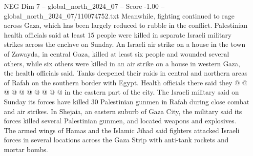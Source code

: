 \begin{textsample}{NEG Dim 7 – global\_north\_2024\_07 – Score -1.00 – global\_north\_2024\_07/110074752.txt}
Meanwhile, fighting continued to rage across Gaza, which has been largely reduced to rubble in the conflict.
Palestinian health officials said at least 15 people were killed in separate Israeli military strikes across the enclave on Sunday.
An Israeli air strike on a house in the town of Zawayda, in central Gaza, killed at least six people and wounded several others, while six others were killed in an air strike on a house in western Gaza, the health officials said.
Tanks deepened their raids in central and northern areas of Rafah on the southern border with Egypt.
Health officials there said they @ @ @ @ @ @ @ @ @ @ in the eastern part of the city.
The Israeli military said on Sunday its forces have killed 30 Palestinian gunmen in Rafah during close combat and air strikes.
In Shejaia, an eastern suburb of Gaza City, the military said its forces killed several Palestinian gunmen, and located weapons and explosives.
The armed wings of Hamas and the Islamic Jihad said fighters attacked Israeli forces in several locations across the Gaza Strip with anti-tank rockets and mortar bombs.

\end{textsample}
